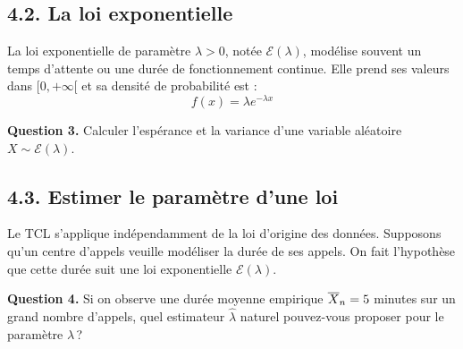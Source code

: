 \subsection*{4.2. La loi exponentielle}

La loi exponentielle de paramètre $\lambda > 0$, notée $\mathcal{E}(\lambda)$, modélise souvent un temps d'attente ou une durée de fonctionnement continue. 
Elle prend ses valeurs dans $[0, +\infty[$ et sa densité de probabilité est :
\[ f(x) = \lambda e^{-\lambda x} \]

\medskip

\textbf{Question 3.} Calculer l'espérance et la variance d'une variable aléatoire $X \sim \mathcal{E}(\lambda)$.


\subsection*{4.3. Estimer le paramètre d'une loi}

Le TCL s'applique indépendamment de la loi d'origine des données. Supposons qu'un centre d'appels veuille modéliser la durée de ses appels. On fait l'hypothèse que cette durée suit une loi exponentielle $\mathcal{E}(\lambda)$.

\medskip

\textbf{Question 4.} Si on observe une durée moyenne empirique $\overline{X}_n = 5$ minutes sur un grand nombre d'appels, quel estimateur $\hat{\lambda}$ naturel pouvez-vous proposer pour le paramètre $\lambda$\,?




